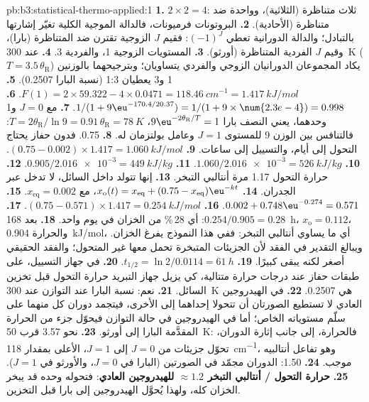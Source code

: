 \begin{solution}{pb:b3:statistical-thermo-applied:1}
\textbf{1.} $2 \times 2 = 4$: ثلاث متناظرة (الثلاثية)، وواحدة ضد متناظرة (الأحادية).
\textbf{2.} البروتونات فرميونات، فالدالة الموجية الكلية تغيّر إشارتها
بالتبادل؛ والدالة الدورانية تعطي $(-1)^J$: فقيم $J$ الزوجية تقترن  ضد المتناظرة (بارا)، وقيم $J$ الفردية  المتناظرة (أورثو).
\textbf{3.} المستويات الزوجية 1، والفردية 3.
\textbf{4.} عند \qty{300}{K} ($T = 3.5\,\theta_{\mathrm R}$) يكاد المجموعان الدورانيان الزوجي والفردي يتساويان؛
وبترجيحهما بالوزنين 1 و3 يعطيان 1:3 (نسبة البارا 0.2507).
\textbf{5.} $F(1) = 2 \times 59.322 - 4 \times 0.0471 = \qty{118.46}{cm^{-1}} = \qty{1.417}{kJ/mol}$.
\textbf{6.} $1/(1 + 9\eu^{-170.4/20.37}) = 1/(1 + 9 \times \num{2.3e-4}) = 0.998$.
\textbf{7.} مع $J = 0$ و1 وحدهما، يعني النصف بارا $9\eu^{-2\theta_{\mathrm R}/T} = 1$، $T = 2\theta_{\mathrm R}/\ln9 =
0.91\,\theta_{\mathrm R} = \qty{78}{K}$: فالتنافس بين الوزن 9 للمستوى $J = 1$ 
وعامل بولتزمان له.
\textbf{8.} 0.75. فدون حفاز يحتاج التحول إلى أيام، والتسييل إلى
ساعات.
\textbf{9.} $(0.75 - 0.002) \times 1.417 = \qty{1.060}{kJ/mol}$.
\textbf{10.} $1.060/\num{2.016e-3} = \qty{526}{kJ/kg}$.
\textbf{11.} $0.905/\num{2.016e-3} = \qty{449}{kJ/kg}$.
\textbf{12.} حرارة التحول 1.17 مرة أنتالبي التبخر.
\textbf{13.} إنها تتولد داخل السائل، لا تدخل عبر الجدران.
\textbf{14.} $x_{\mathrm o}(t) = x_{\mathrm{eq}} + (0.75 - x_{\mathrm{eq}})\eu^{-kt}$، مع $x_{\mathrm{eq}} = 0.002$.
\textbf{15.} $0.002 + 0.748\eu^{-0.274} = 0.571$.
\textbf{16.} $(0.75 - 0.571) \times 1.417 = \qty{0.254}{kJ/mol}$.
\textbf{17.} $0.254/0.905 = 0.28$: أي 28\,\% من الخزان في يوم واحد.
\textbf{18.} بعد \qty{168}{h}، $x_{\mathrm o} = 0.112$، والحرارة \qty{0.904}{kJ/mol}، أي ما يساوي أنتالبي
التبخر: ففي هذا النموذج يفرغ الخزان. ويبالغ التقدير في
الفقد لأن الجزيئات المتبخرة تحمل معها  غير المتحول؛
والفقد الحقيقي أصغر لكنه يبقى كبيرًا.
\textbf{19.} $t_{1/2} = \ln2/0.0114 = \qty{61}{h}$.
\textbf{20.} في جهاز التسييل، على طبقات حفاز عند درجات حرارة متتالية، كي
يزيل جهاز التبريد حرارة التحول قبل تخزين السائل.
\textbf{21.} نعم: نسبة البارا عند التوازن عند \qty{300}{K} هي 0.2507.
\textbf{22.} في الهيدروجين العادي لا تستطيع الصورتان أن تتحولا إحداهما إلى الأخرى، فيتجمد
دوران كل منهما على سلّم مستوياته الخاص؛ أما في الهيدروجين في حالة التوازن فيحوّل جزء من
الحرارة المقدَّمة البارا إلى أورثو.
\textbf{23.} نحو 3.57 قرب \qty{50}{K}: فالحرارة، إلى جانب إثارة الدوران، تحوّل
جزيئات من $J = 0$ إلى $J = 1$، الأعلى بمقدار \qty{118}{cm^{-1}}، وهو تفاعل أنتالبيه
موجب.
\textbf{24.} 1.50: الدوران مجمّد في الصورتين (البارا في $J = 0$، والأورثو في $J = 1$).
\textbf{25.} \textbf{حرارة التحول / أنتالبي التبخر $\approx 1.2$ للهيدروجين
العادي}: فتحوله وحده قد يبخر الخزان كله، ولهذا
يُحوَّل الهيدروجين إلى بارا قبل التخزين.
\end{solution}
